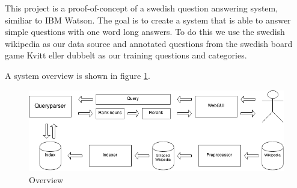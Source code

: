 
This project is a proof-of-concept of a swedish question answering system, similiar to IBM Watson.
The goal is to create a system that is able to answer simple questions with one word long answers.
To do this we use the swedish wikipedia as our data source and annotated questions from the swedish 
board game Kvitt eller dubbelt as our training questions and categories.

A system overview is shown in figure \ref{fig:overview}. 

\begin{figure}
\centering
\includegraphics[width=1\textwidth]{figures/Question-answering-system.png}
\caption{Overview}
\label{fig:overview}
\end{figure}
